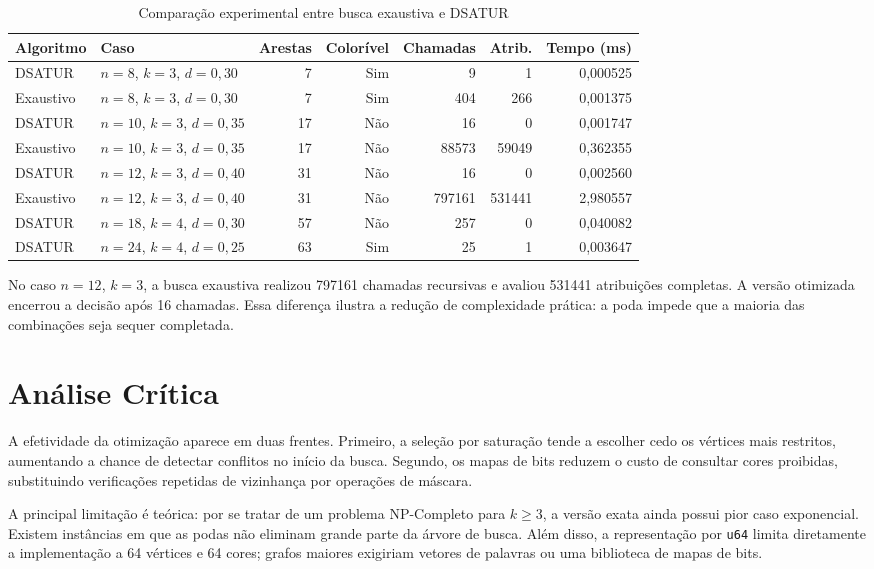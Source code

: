 \documentclass[12pt]{article}
\begin{document}
\begin{table}[H]
\centering
\caption{Comparação experimental entre busca exaustiva e DSATUR}
\label{tab:resultados}
\footnotesize
\begin{tabular}{llrrrrr}
\toprule
Algoritmo & Caso & Arestas & Colorível & Chamadas & Atrib. & Tempo (ms) \\
\midrule
DSATUR & $n=8$, $k=3$, $d=0{,}30$ & 7 & Sim & 9 & 1 & 0,000525 \\
Exaustivo & $n=8$, $k=3$, $d=0{,}30$ & 7 & Sim & 404 & 266 & 0,001375 \\
\midrule
DSATUR & $n=10$, $k=3$, $d=0{,}35$ & 17 & Não & 16 & 0 & 0,001747 \\
Exaustivo & $n=10$, $k=3$, $d=0{,}35$ & 17 & Não & 88573 & 59049 & 0,362355 \\
\midrule
DSATUR & $n=12$, $k=3$, $d=0{,}40$ & 31 & Não & 16 & 0 & 0,002560 \\
Exaustivo & $n=12$, $k=3$, $d=0{,}40$ & 31 & Não & 797161 & 531441 & 2,980557 \\
\midrule
DSATUR & $n=18$, $k=4$, $d=0{,}30$ & 57 & Não & 257 & 0 & 0,040082 \\
DSATUR & $n=24$, $k=4$, $d=0{,}25$ & 63 & Sim & 25 & 1 & 0,003647 \\
\bottomrule
\end{tabular}
\end{table}

No caso $n=12$, $k=3$, a busca exaustiva realizou 797161 chamadas recursivas e
avaliou 531441 atribuições completas. A versão otimizada encerrou a decisão após
16 chamadas. Essa diferença ilustra a redução de complexidade prática: a poda
impede que a maioria das combinações seja sequer completada.

\section{Análise Crítica}

A efetividade da otimização aparece em duas frentes. Primeiro, a seleção por
saturação tende a escolher cedo os vértices mais restritos, aumentando a chance
de detectar conflitos no início da busca. Segundo, os mapas de bits reduzem o
custo de consultar cores proibidas, substituindo verificações repetidas de vizinhança por
operações de máscara.

A principal limitação é teórica: por se tratar de um problema NP-Completo para
$k \geq 3$, a versão exata ainda possui pior caso exponencial. Existem instâncias
em que as podas não eliminam grande parte da árvore de busca. Além disso, a
representação por \texttt{u64} limita diretamente a implementação a 64 vértices e 64
cores; grafos maiores exigiriam vetores de palavras ou uma biblioteca de
mapas de bits.
\end{document}
